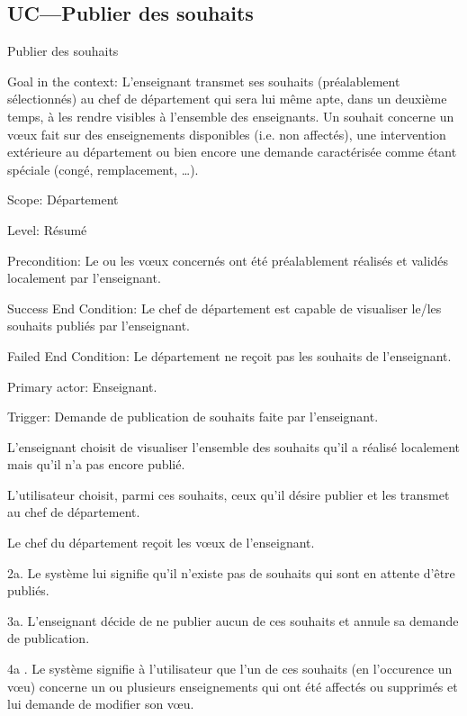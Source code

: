\begin{ocl}
\subsection{UC---Publier des souhaits}
\begin{usecase}{Publier des souhaits}
\label{usecase:publier}
\begin{information}
	\item[Goal in the context:] L'enseignant transmet ses souhaits (préalablement sélectionnés) au chef de département qui sera lui même apte, dans un deuxième temps, à les rendre visibles à l'ensemble des enseignants.
Un souhait concerne un vœux fait sur des enseignements disponibles (i.e. non affectés), une intervention extérieure au département ou bien encore une demande caractérisée comme étant spéciale (congé, remplacement, \dots). 
	\item[Scope:] Département
	\item[Level:] Résumé
	\item[Precondition:] Le ou les vœux concernés ont été préalablement réalisés et validés localement par l'enseignant.
	\item[Success End Condition:] Le chef de département est capable de visualiser le/les souhaits publiés par l'enseignant.
	\item[Failed End Condition:] Le département ne reçoit pas les souhaits de l'enseignant.
	\item[Primary actor:] Enseignant.
	\item[Trigger:] Demande de publication de souhaits faite par l'enseignant.
\end{information}
\end{usecase}


\begin{scenario}
	\item L'enseignant choisit de visualiser l'ensemble des souhaits qu'il a réalisé localement mais qu'il n'a pas encore publié.
	\item L'utilisateur choisit, parmi ces souhaits, ceux qu'il désire publier et les transmet au chef de département.
	\item Le chef du département reçoit les vœux de l'enseignant.
\end{scenario}

 \begin{extension}
	 \item [2a.] Le système lui signifie qu'il n'existe pas de souhaits qui sont en attente d'être publiés.
	 \item [3a.] L'enseignant décide de ne publier aucun de ces souhaits et annule sa demande de publication.
	 \item [4a]. Le système signifie à l'utilisateur que l'un de ces souhaits (en l'occurence un vœu) concerne un ou plusieurs enseignements qui ont été affectés ou supprimés et lui demande de modifier son vœu.\\
 \end{extension}



\end{ocl}

